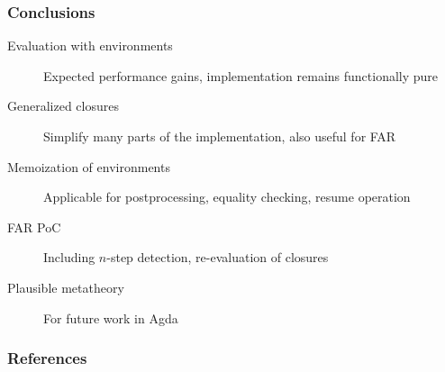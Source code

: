 \documentclass{beamer}
\begin{document}
\begin{frame}
  \frametitle{Conclusions}

  \begin{description}
  \item[Evaluation with environments] Expected performance gains, implementation remains functionally pure
  \item[Generalized closures] Simplify many parts of the implementation, also useful for FAR
  \item[Memoization of environments] Applicable for postprocessing, equality checking, resume operation
  \item[FAR PoC] Including $n$-step detection, re-evaluation of closures
  \item[Plausible metatheory] For future work in Agda
  \end{description}
\end{frame}

\begin{frame}[allowframebreaks]
  \frametitle{References}

  \tiny
  
  
\end{frame}
\end{document}
